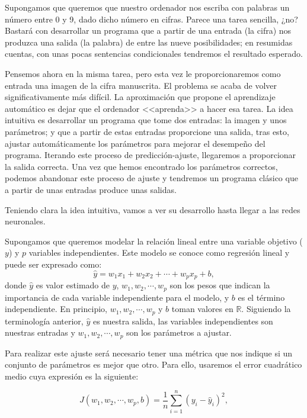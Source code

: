 \documentclass[12pt, a4paper, twoside]{book}
\numberwithin{equation}{section}
\theoremstyle{definition}
\theoremstyle{remark}
\theoremstyle{plain}
\begin{document}
	Supongamos que queremos que nuestro ordenador nos escriba con palabras
	un número entre 0 y 9, dado dicho número en cifras. Parece una tarea 
	sencilla, ¿no?
	Bastará con desarrollar un programa que a partir de una entrada (la 
	cifra) nos produzca una salida (la palabra) de entre las nueve 
	posibilidades; en resumidas cuentas, con unas pocas sentencias 
	condicionales tendremos el resultado esperado.  

	Pensemos ahora en la 
	misma tarea, pero esta vez le proporcionaremos como entrada una imagen
	de la cifra manuscrita. El problema se acaba de volver 
	significativamente más difícil. La aproximación que propone el 
	aprendizaje automático es dejar que el ordenador <<aprenda>> a hacer 
	esa tarea. La idea intuitiva es desarrollar un programa que tome dos 
	entradas: la imagen y unos parámetros; y que a partir de estas 
	entradas proporcione una salida, tras esto, ajustar automáticamente 
	los parámetros para mejorar el desempeño del programa. Iterando este 
	proceso de predicción-ajuste, llegaremos a proporcionar la salida 
	correcta. Una vez que hemos encontrado los parámetros correctos,
	podemos abandonar este proceso de ajuste y tendremos un 
	programa clásico que a partir de unas entradas produce unas salidas.

	Teniendo clara la idea intuitiva, vamos a ver su desarrollo hasta 
	llegar a las redes neuronales.

	Supongamos que queremos modelar la relación lineal entre una variable
	objetivo ($y$) y $p$ variables independientes. Este modelo se conoce 
	como regresión lineal y puede ser expresado como:
	\begin{equation*}
		\hat{y}=w_{1}x_{1}+w_{2}x_{2}+\cdots+w_{p}x_{p}+b,
	\end{equation*}
	donde $\hat{y}$ es valor estimado de $y$, $w_{1},w_{2},\cdots,w_{p}$ 
	son los pesos que indican la importancia de cada variable 
	independiente para el modelo, y $b$ es el término independiente. En 
	principio, $w_{1},w_{2},\cdots,w_{p}$ y $b$ toman valores en 
	$\mathbb{R}$.
	Siguiendo la terminología anterior, $\hat{y}$ es nuestra salida, las 
	variables independientes son nuestras entradas y $w_{1},w_{2},\cdots,
	w_{p}$ son los parámetros a ajustar. 

	Para realizar este ajuste será necesario tener una métrica que nos 
	indique si un conjunto de parámetros es mejor que otro. Para ello,
	usaremos el error cuadrático medio cuya expresión es la siguiente:

	\begin{equation*}
		J(w_{1},w_{2},\cdots,w_{p},b)=\frac{1}{n}\sum_{i=1}^{n}(y_{i}-\hat{y}_{i})^2,
	\end{equation*}
\end{document}
